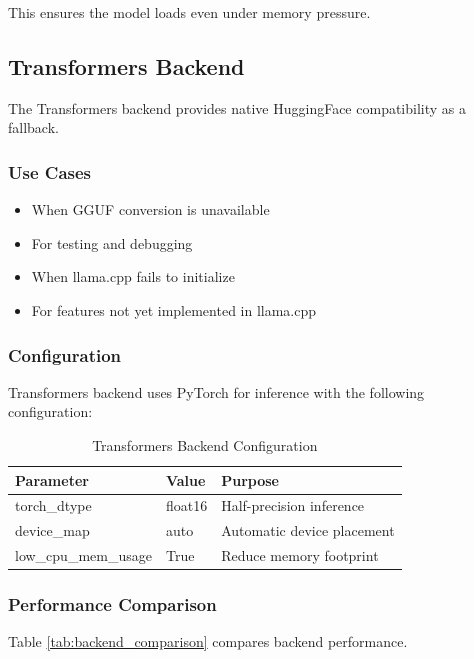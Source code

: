 This ensures the model loads even under memory pressure.

\subsection{Transformers Backend}

The Transformers backend provides native HuggingFace compatibility as a fallback.

\subsubsection{Use Cases}

\begin{itemize}
    \item When GGUF conversion is unavailable
    \item For testing and debugging
    \item When llama.cpp fails to initialize
    \item For features not yet implemented in llama.cpp
\end{itemize}

\subsubsection{Configuration}

Transformers backend uses PyTorch for inference with the following configuration:

\begin{table}[h]
\centering
\caption{Transformers Backend Configuration}
\label{tab:transformers_config}
\begin{tabular}{lll}
\toprule
\textbf{Parameter} & \textbf{Value} & \textbf{Purpose} \\
\midrule
torch\_dtype & float16 & Half-precision inference \\
device\_map & auto & Automatic device placement \\
low\_cpu\_mem\_usage & True & Reduce memory footprint \\
\bottomrule
\end{tabular}
\end{table}

\subsubsection{Performance Comparison}

Table \ref{tab:backend_comparison} compares backend performance.

